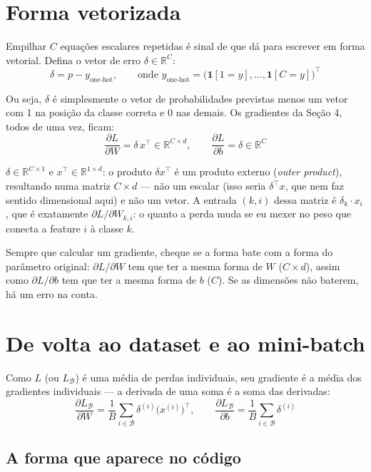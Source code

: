 \documentclass[11pt]{article}
\newcommand{\R}{\mathbb{R}}
\begin{document}
\section{Forma vetorizada}

Empilhar $C$ equações escalares repetidas é sinal de que dá para escrever em forma vetorial. Defina o vetor de erro $\delta \in \R^C$:
$$
\delta = p - y_{\text{one-hot}}, \qquad \text{onde } y_{\text{one-hot}} = \big(\mathbf{1}[1=y],\dots,\mathbf{1}[C=y]\big)^\top
$$

Ou seja, $\delta$ é simplesmente o vetor de probabilidades previstas menos um vetor com 1 na posição da classe correta e 0 nas demais. Os gradientes da Seção 4, todos de uma vez, ficam:
$$
\frac{\partial L}{\partial W} = \delta\, x^\top \in \R^{C\times d}, \qquad
\frac{\partial L}{\partial b} = \delta \in \R^C
$$

\begin{sanidade}
$\delta \in \R^{C\times 1}$ e $x^\top \in \R^{1\times d}$: o produto $\delta x^\top$ é um produto externo (\emph{outer product}), resultando numa matriz $C\times d$ --- não um escalar (isso seria $\delta^\top x$, que nem faz sentido dimensional aqui) e não um vetor. A entrada $(k,i)$ dessa matriz é $\delta_k \cdot x_i$, que é exatamente $\partial L/\partial W_{k,i}$: o quanto a perda muda se eu mexer no peso que conecta a feature $i$ à classe $k$.

Sempre que calcular um gradiente, cheque se a forma bate com a forma do parâmetro original: $\partial L/\partial W$ tem que ter a mesma forma de $W$ ($C\times d$), assim como $\partial L/\partial b$ tem que ter a mesma forma de $b$ ($C$). Se as dimensões não baterem, há um erro na conta.
\end{sanidade}

\section{De volta ao dataset e ao mini-batch}

Como $L$ (ou $L_{\mathcal{B}}$) é uma média de perdas individuais, seu gradiente é a média dos gradientes individuais --- a derivada de uma soma é a soma das derivadas:
$$
\frac{\partial L_{\mathcal{B}}}{\partial W} = \frac{1}{B}\sum_{i\in\mathcal{B}} \delta^{(i)} \big(x^{(i)}\big)^\top, \qquad
\frac{\partial L_{\mathcal{B}}}{\partial b} = \frac{1}{B}\sum_{i\in\mathcal{B}} \delta^{(i)}
$$

\subsection*{A forma que aparece no código}
\end{document}

